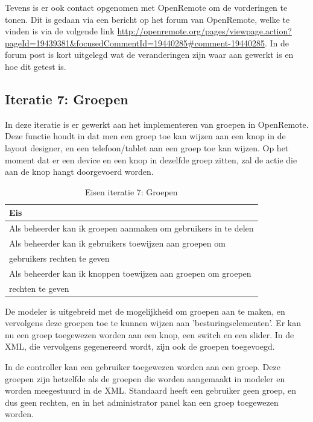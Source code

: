 \documentclass[]{article}
\begin{document}
Tevens is er ook contact opgenomen met OpenRemote om de vorderingen te tonen.
Dit is gedaan via een bericht op het forum van OpenRemote, welke te vinden is via
de volgende link 
\url{http://openremote.org/pages/viewpage.action?pageId=19439381&focusedCommentId=19440285#comment-19440285}. 
In de forum post is kort uitgelegd wat de veranderingen zijn waar aan gewerkt is en hoe dit getest is. 
 
\subsection{Iteratie 7: Groepen}

In deze iteratie is er gewerkt aan het implementeren van groepen in OpenRemote.
Deze functie houdt in dat men een groep toe kan wijzen aan een knop in de layout
designer, en een telefoon/tablet aan een groep toe kan wijzen. Op het moment dat er
een device en een knop in dezelfde groep zitten, zal de actie die aan de knop
hangt doorgevoerd worden.

\begin{table}[htpb]
  \caption{Eisen iteratie 7: Groepen}
  \begin{center}
    \begin{tabular}{|| l ||}\hline
        Eis                                                              \\\hline\hline
        Als beheerder kan ik groepen aanmaken om gebruikers in te delen  \\\hline
        Als beheerder kan ik gebruikers toewijzen aan groepen om         \\ 
        gebruikers rechten te geven                                      \\\hline
        Als beheerder kan ik knoppen toewijzen aan groepen om groepen    \\ 
        rechten te geven                                                 \\\hline
    \end{tabular}
  \end{center}
\end{table}

De modeler is uitgebreid met de mogelijkheid om groepen aan te maken, en
vervolgens deze groepen toe te kunnen wijzen aan 'besturingselementen'. Er kan
nu een groep toegewezen worden aan een knop, een switch en een slider. In de XML,
die vervolgens gegenereerd wordt, zijn ook de groepen toegevoegd. 

In de controller kan een gebruiker toegewezen worden aan een groep. Deze groepen
zijn hetzelfde als de groepen die worden aangemaakt in modeler en worden
meegestuurd in de XML. Standaard heeft een gebruiker geen groep, en dus geen
rechten, en in het administrator panel kan een groep toegewezen worden.
\end{document}
